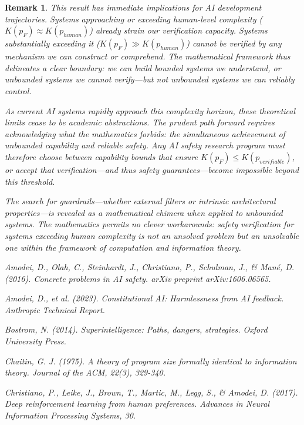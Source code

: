 \documentclass[11pt]{article}
\newtheorem{remark}{Remark}
\begin{document}
\begin{remark}
This result has immediate implications for AI development trajectories. Systems approaching or exceeding human-level complexity ($K(p_F) \approx K(p_{human})$) already strain our verification capacity. Systems substantially exceeding it ($K(p_F) \gg K(p_{human})$) cannot be verified by any mechanism we can construct or comprehend. The mathematical framework thus delineates a clear boundary: we can build bounded systems we understand, or unbounded systems we cannot verify—but not unbounded systems we can reliably control.

As current AI systems rapidly approach this complexity horizon, these theoretical limits cease to be academic abstractions. The prudent path forward requires acknowledging what the mathematics forbids: the simultaneous achievement of unbounded capability and reliable safety. Any AI safety research program must therefore choose between capability bounds that ensure $K(p_F) \leq K(p_{verifiable})$, or accept that verification—and thus safety guarantees—become impossible beyond this threshold.

The search for guardrails—whether external filters or intrinsic architectural properties—is revealed as a mathematical chimera when applied to unbounded systems. The mathematics permits no clever workarounds: safety verification for systems exceeding human complexity is not an unsolved problem but an unsolvable one within the framework of computation and information theory.

\begin{thebibliography}{99}
Amodei, D., Olah, C., Steinhardt, J., Christiano, P., Schulman, J., \& Mané, D. (2016). Concrete problems in AI safety. arXiv preprint arXiv:1606.06565.

Amodei, D., et al. (2023). Constitutional AI: Harmlessness from AI feedback. Anthropic Technical Report.

Bostrom, N. (2014). Superintelligence: Paths, dangers, strategies. Oxford University Press.

Chaitin, G. J. (1975). A theory of program size formally identical to information theory. Journal of the ACM, 22(3), 329-340.

Christiano, P., Leike, J., Brown, T., Martic, M., Legg, S., \& Amodei, D. (2017). Deep reinforcement learning from human preferences. Advances in Neural Information Processing Systems, 30.


\end{thebibliography}
\end{remark}
\end{document}
